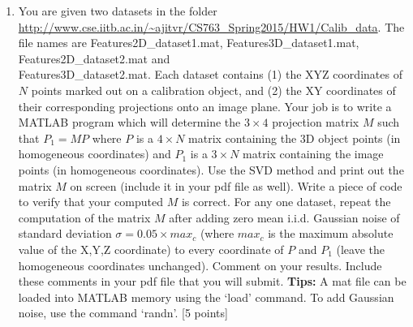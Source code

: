 \documentclass[11pt]{article}
\begin{document}
\begin{enumerate}
\item You are given two datasets in the folder \url{http://www.cse.iitb.ac.in/~ajitvr/CS763_Spring2015/HW1/Calib_data}. The file names are Features2D\_dataset1.mat, Features3D\_dataset1.mat, Features2D\_dataset2.mat and \\ Features3D\_dataset2.mat. Each dataset contains (1) the XYZ coordinates of $N$ points marked out on a calibration object, and (2) the XY coordinates of their corresponding projections onto an image plane. Your job is to write a MATLAB program which will determine the $3 \times 4$ projection matrix $M$ such that $P_1 = MP$ where $P$ is a $4 \times N$ matrix containing the 3D object points (in homogeneous coordinates) and $P_1$ is a $3 \times N$ matrix containing the image points (in homogeneous coordinates). Use the SVD method and print out the matrix $M$ on screen (include it in your pdf file as well). Write a piece of code to verify that your computed $M$ is correct. For any one dataset, repeat the computation of the matrix $M$ after adding zero mean i.i.d. Gaussian noise of standard deviation $\sigma = 0.05 \times max_c$ (where $max_c$ is the maximum absolute value of the X,Y,Z coordinate) to every coordinate of $P$ and $P_1$ (leave the homogeneous coordinates unchanged). Comment on your results. Include these comments in your pdf file that you will submit. \textbf{Tips:} A mat file can be loaded into MATLAB memory using the `load' command. To add Gaussian noise, use the command `randn'. \textsf{[5 points]}


\end{enumerate}
\end{document}
